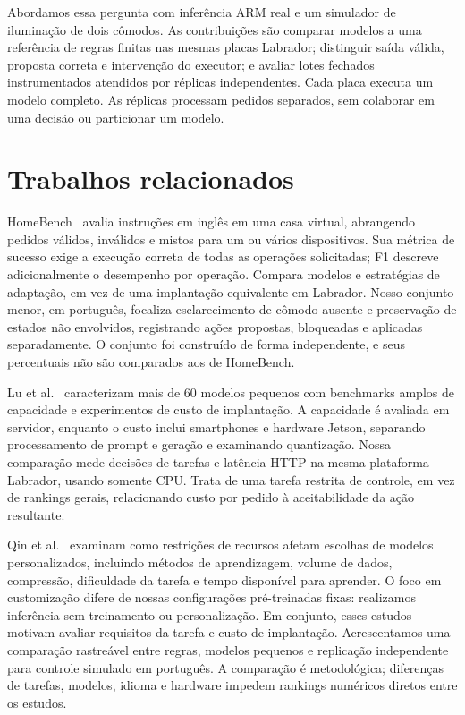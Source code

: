\documentclass[letterpaper,conference]{IEEEtran}
\begin{document}
Abordamos essa pergunta com inferência ARM real e um simulador de iluminação de dois cômodos. As contribuições são comparar modelos a uma referência de regras finitas nas mesmas placas Labrador; distinguir saída válida, proposta correta e intervenção do executor; e avaliar lotes fechados instrumentados atendidos por réplicas independentes. Cada placa executa um modelo completo. As réplicas processam pedidos separados, sem colaborar em uma decisão ou particionar um modelo.

\section{Trabalhos relacionados}
HomeBench~\cite{homebench} avalia instruções em inglês em uma casa virtual, abrangendo pedidos válidos, inválidos e mistos para um ou vários dispositivos. Sua métrica de sucesso exige a execução correta de todas as operações solicitadas; F1 descreve adicionalmente o desempenho por operação. Compara modelos e estratégias de adaptação, em vez de uma implantação equivalente em Labrador. Nosso conjunto menor, em português, focaliza esclarecimento de cômodo ausente e preservação de estados não envolvidos, registrando ações propostas, bloqueadas e aplicadas separadamente. O conjunto foi construído de forma independente, e seus percentuais não são comparados aos de HomeBench.

Lu et al.~\cite{edge} caracterizam mais de 60 modelos pequenos com benchmarks amplos de capacidade e experimentos de custo de implantação. A capacidade é avaliada em servidor, enquanto o custo inclui smartphones e hardware Jetson, separando processamento de prompt e geração e examinando quantização. Nossa comparação mede decisões de tarefas e latência HTTP na mesma plataforma Labrador, usando somente CPU. Trata de uma tarefa restrita de controle, em vez de rankings gerais, relacionando custo por pedido à aceitabilidade da ação resultante.

Qin et al.~\cite{empirical} examinam como restrições de recursos afetam escolhas de modelos personalizados, incluindo métodos de aprendizagem, volume de dados, compressão, dificuldade da tarefa e tempo disponível para aprender. O foco em customização difere de nossas configurações pré-treinadas fixas: realizamos inferência sem treinamento ou personalização. Em conjunto, esses estudos motivam avaliar requisitos da tarefa e custo de implantação. Acrescentamos uma comparação rastreável entre regras, modelos pequenos e replicação independente para controle simulado em português. A comparação é metodológica; diferenças de tarefas, modelos, idioma e hardware impedem rankings numéricos diretos entre os estudos.
\end{document}
